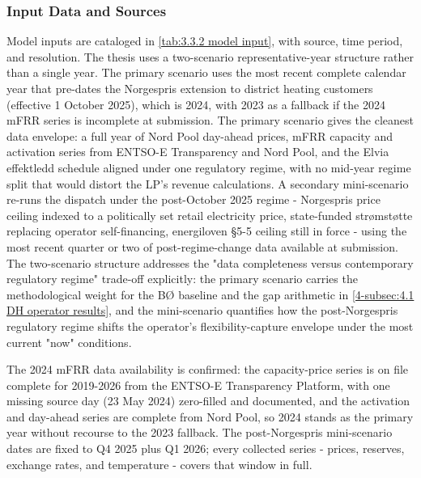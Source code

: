 


\subsubsection{Input Data and Sources}
\label{3-subsec:3.3.2 input data sources}

Model inputs are cataloged in \autoref{tab:3.3.2 model input}, with source, time period, and resolution. The thesis uses a two-scenario representative-year structure rather than a single year. The primary scenario uses the most recent complete calendar year that pre-dates the Norgespris extension to district heating customers (effective 1 October 2025), which is 2024, with 2023 as a fallback if the 2024 mFRR series is incomplete at submission. The primary scenario gives the cleanest data envelope: a full year of Nord Pool day-ahead prices, mFRR capacity and activation series from ENTSO-E Transparency and Nord Pool, and the Elvia effektledd schedule aligned under one regulatory regime, with no mid-year regime split that would distort the LP's revenue calculations. A secondary mini-scenario re-runs the dispatch under the post-October 2025 regime - Norgespris price ceiling indexed to a politically set retail electricity price, state-funded strømstøtte replacing operator self-financing, energiloven §5-5 ceiling still in force - using the most recent quarter or two of post-regime-change data available at submission. The two-scenario structure addresses the "data completeness versus contemporary regulatory regime" trade-off explicitly: the primary scenario carries the methodological weight for the BØ baseline and the gap arithmetic in \autoref{4-subsec:4.1 DH operator results}, and the mini-scenario quantifies how the post-Norgespris regulatory regime shifts the operator's flexibility-capture envelope under the most current "now" conditions. 

The 2024 mFRR data availability is confirmed: the capacity-price series is on file complete for 2019-2026 from the ENTSO-E Transparency Platform, with one missing source day (23 May 2024) zero-filled and documented, and the activation and day-ahead series are complete from Nord Pool, so 2024 stands as the primary year without recourse to the 2023 fallback. The post-Norgespris mini-scenario dates are fixed to Q4 2025 plus Q1 2026; every collected series - prices, reserves, exchange rates, and temperature - covers that window in full.


